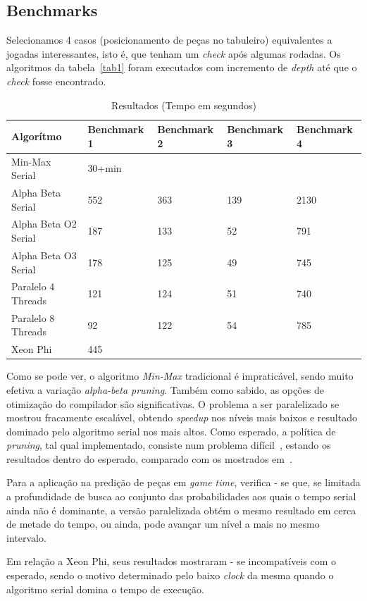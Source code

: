 \documentclass[12pt,a4paper,final]{article}
\begin{document}
\subsection{Benchmarks}

Selecionamos 4 casos (posicionamento de peças no tabuleiro) equivalentes a jogadas interessantes, isto é, que tenham um \textit{check} após algumas rodadas. Os algoritmos da tabela~\ref{tab1} foram executados com incremento de \textit{depth} até que o \textit{check} fosse encontrado.

\begin{table}[h]
	\label{tab1}
	\centering
	\caption{Resultados (Tempo em segundos)}
	\label{my-label}
	\begin{tabular}{|l|l|l|l|l|}
		\hline
		Algorítmo            & Benchmark 1 & Benchmark 2 & Benchmark 3 & Benchmark 4 \\ \hline
		Min-Max Serial       & 30+min           & \infty           & \infty           & \infty           \\ \hline
		Alpha Beta Serial    & 552          & 363           & 139           & 2130           \\ \hline
		Alpha Beta O2 Serial & 187           & 133           & 52           & 791           \\ \hline
		Alpha Beta O3 Serial & 178           & 125           & 49           & 745           \\ \hline
		Paralelo 4 Threads   & 121           & 124           & 51           & 740           \\ \hline
		Paralelo 8 Threads   & 92           & 122           & 54           & 785           \\ \hline
		Xeon Phi             & 445           & \infty          & \infty           & \infty           \\ \hline
	\end{tabular}
\end{table}

Como se pode ver, o algoritmo \textit{Min-Max} tradicional é impraticável, sendo muito efetiva a variação \textit{alpha-beta pruning}. Também como sabido, as opções de otimização do compilador são significativas. O problema a ser paralelizado se mostrou fracamente escalável, obtendo \textit{speedup} nos níveis mais baixos e resultado dominado pelo algoritmo serial nos mais altos. Como esperado, a política de \textit{pruning}, tal qual implementado, consiste num problema difícil~\cite{chess1}, estando os resultados dentro do esperado, comparado com os mostrados em~\cite{chess2}.

Para a aplicação na predição de peças em \textit{game time}, verifica - se que, se limitada a profundidade de busca ao conjunto das probabilidades aos quais o tempo serial ainda não é dominante, a versão paralelizada obtém o mesmo resultado em cerca de metade do tempo, ou ainda, pode avançar um nível a mais no mesmo intervalo.

Em relação a Xeon Phi, seus resultados mostraram - se incompatíveis com o esperado, sendo o motivo determinado pelo baixo \textit{clock} da mesma quando o algoritmo serial domina o tempo de execução.

%  


\end{document}
